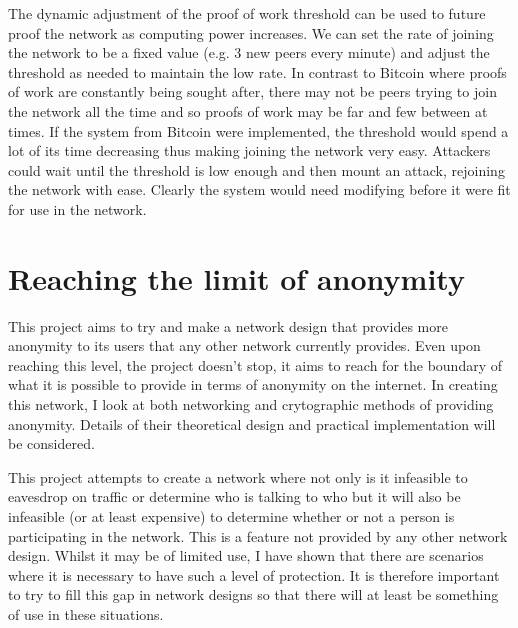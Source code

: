 \documentclass[ %
                    author={Luke Murray},
                supervisor={Dr. Simon Hollis},
                     title={Shadow Peer-to-Peer Networks},
                  subtitle={},
                    degree={MEng},
                      year={2013} ]{thesis}
\begin{document}
The dynamic adjustment of the proof of work threshold can be used to future proof the network as computing power increases. We can set the rate of joining the network to be a fixed value (e.g. 3 new peers every minute) and adjust the threshold as needed to maintain the low rate. In contrast to Bitcoin where proofs of work are constantly being sought after, there may not be peers trying to join the network all the time and so proofs of work may be far and few between at times. If the system from Bitcoin were implemented, the threshold would spend a lot of its time decreasing thus making joining the network very easy. Attackers could wait until the threshold is low enough and then mount an attack, rejoining the network with ease. Clearly the system would need modifying before it were fit for use in the network.


\section{Reaching the limit of anonymity}

This project aims to try and make a network design that provides more anonymity to its users that any other network currently provides. Even upon reaching this level, the project doesn't stop, it aims to reach for the boundary of what it is possible to provide in terms of anonymity on the internet. In creating this network, I look at both networking and crytographic methods of providing anonymity. Details of their theoretical design and practical implementation will be considered.

This project attempts to create a network where not only is it infeasible to eavesdrop on traffic or determine who is talking to who but it will also be infeasible (or at least expensive) to determine whether or not a person is participating in the network. This is a feature not provided by any other network design. Whilst it may be of limited use, I have shown that there are scenarios where it is necessary to have such a level of protection. It is therefore important to try to fill this gap in network designs so that there will at least be something of use in these situations.
\end{document}

